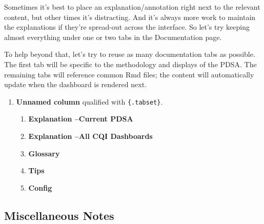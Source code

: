 \documentclass[
]{book}
\providecommand{\tightlist}{%
  \setlength{\itemsep}{0pt}\setlength{\parskip}{0pt}}
\begin{document}
Sometimes it's best to place an explanation/annotation right next to the relevant content, but other times it's distracting. And it's always more work to maintain the explanations if they're spread-out across the interface. So let's try keeping almost everything under one or two tabs in the Documentation page.

To help beyond that, let's try to reuse as many documentation tabs as possible. The first tab will be specific to the methodology and displays of the PDSA. The remaining tabs will reference common Rmd files; the content will automatically update when the dashboard is rendered next.

\begin{enumerate}
\def\labelenumi{\arabic{enumi}.}
\item
  \textbf{Unnamed column} qualified with \texttt{\{.tabset\}}.

  \begin{enumerate}
  \def\labelenumii{\arabic{enumii}.}
  \tightlist
  \item
    \textbf{Explanation --Current PDSA}
  \item
    \textbf{Explanation --All CQI Dashboards}
  \item
    \textbf{Glossary}
  \item
    \textbf{Tips}
  \item
    \textbf{Config}
  \end{enumerate}
\end{enumerate}

\hypertarget{miscellaneous-notes}{%
\subsection{Miscellaneous Notes}\label{miscellaneous-notes}}
\end{document}
